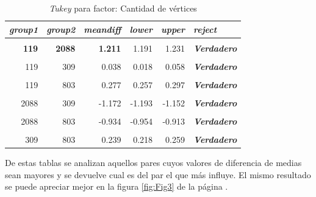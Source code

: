 \documentclass{article}
\begin{document}
\begin{table}[htbp]
  \centering
  \caption{\textit{Tukey} para factor: Cantidad de vértices}
    \begin{tabular}{rrrrrl}
    \toprule
    \multicolumn{1}{l}{\textit{\textbf{group1}}} & \multicolumn{1}{l}{\textit{\textbf{group2}}} & \multicolumn{1}{l}{\textit{\textbf{meandiff}}} & \multicolumn{1}{l}{\textit{\textbf{lower}}} & \multicolumn{1}{l}{\textit{\textbf{upper}}} & \textit{\textbf{reject}} \\
    \midrule
          &       &       &       &       &  \\
    \textbf{119} & \textbf{2088} & \textbf{1.211} & 1.191 & 1.231 & \textit{\textbf{Verdadero}} \\
          &       &       &       &       &  \\
    119   & 309   & 0.038 & 0.018 & 0.058 & \textit{\textbf{Verdadero}} \\
          &       &       &       &       &  \\
    119   & 803   & 0.277 & 0.257 & 0.297 & \textit{\textbf{Verdadero}} \\
          &       &       &       &       &  \\
    2088  & 309   & -1.172 & -1.193 & -1.152 & \textit{\textbf{Verdadero}} \\
          &       &       &       &       &  \\
    2088  & 803   & -0.934 & -0.954 & -0.913 & \textit{\textbf{Verdadero}} \\
          &       &       &       &       &  \\
    309   & 803   & 0.239 & 0.218 & 0.259 & \textit{\textbf{Verdadero}} \\
    \bottomrule
    \end{tabular}%
  \label{tab:addlabel}%
\end{table}%

De estas tablas se analizan aquellos pares cuyos valores de diferencia de medias sean mayores y se devuelve cual es del par el que más influye. El mismo resultado se puede apreciar mejor en la figura \ref{fig:Fig3} de la página \pageref{fig:Fig3}.
\end{document}
